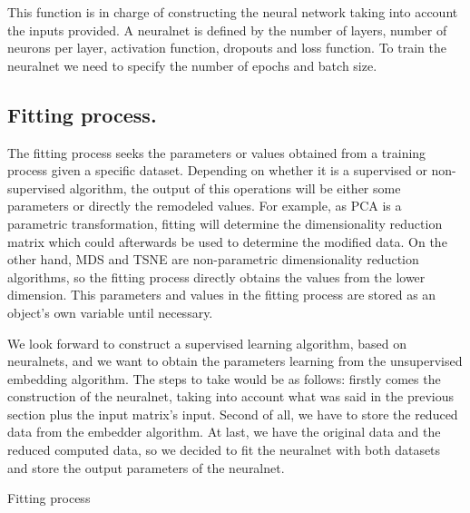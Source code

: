 \documentclass[a4paper,11pt,spanish]{report}
\makeatletter
\def\BState{\State\hskip-\ALG@thistlm}
\makeatother
\begin{document}
This function is in charge of constructing the neural network taking into account the inputs provided. A neuralnet is defined by the number of layers, number of neurons per layer, activation function, dropouts and loss function. To train the neuralnet we need to specify the number of epochs and batch size.

\subsection{Fitting process.}
\label{ssec:fit}

The fitting process seeks the parameters or values obtained from a training process given a specific dataset. Depending on whether it is a supervised or non-supervised algorithm, the output of this operations will be either some parameters or directly the remodeled values. For example, as PCA is a parametric transformation, fitting will determine the dimensionality reduction matrix which could afterwards be used to determine the modified data. On the other hand, MDS and TSNE are non-parametric dimensionality reduction algorithms, so the fitting process directly obtains the values from the lower dimension. This parameters and values in the fitting process are stored as an object's own variable until necessary.

We look forward to construct a supervised learning algorithm, based on neuralnets, and we want to obtain the parameters learning from the unsupervised embedding algorithm. The steps to take would be as follows: firstly comes the construction of the neuralnet, taking into account what was said in the previous section plus the input matrix's input. Second of all, we have to store the reduced data from the embedder algorithm. At last, we have the original data and the reduced computed data, so we decided to fit the neuralnet with both datasets and store the output parameters of the neuralnet.
\vspace{10pt}

\begin{algorithm}
\caption{Fitting process}
\end{algorithm}
\end{document}
